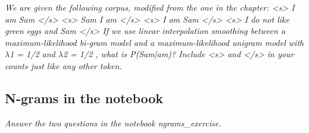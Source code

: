\documentclass[a4paper, 11pt]{article}
\begin{document}
\textit{We are given the following corpus, modified from the one in the chapter:
<s> I am Sam </s>
<s> Sam I am </s>
<s> I am Sam </s>
<s> I do not  like green eggs and Sam </s>
If we use linear interpolation smoothing between a maximum-likelihood bi-gram model and a maximum-likelihood unigram model with $\lambda$1 = 1/2 and $\lambda$2 = 1/2 , what is P(Sam|am)? Include <s> and </s> in your counts just like any other token.}

\subsection{N-grams in the notebook}

\textit{Answer the two questions in the notebook ngrams\_exercise.}
\end{document}
